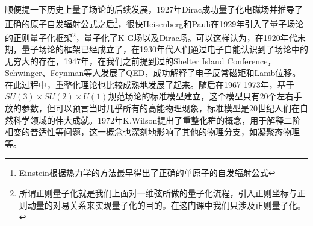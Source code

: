     顺便提一下历史上量子场论的后续发展，1927年Dirac成功量子化电磁场并推导了正确的原子自发辐射公式之后\footnote{Einstein根据热力学的方法最早得出了正确的单原子的自发辐射公式}，很快Heisenberg和Pauli在1929年引入了量子场论的正则量子化框架\footnote{所谓正则量子化就是我们上面对一维弦所做的量子化流程，引入正则坐标与正则动量的对易关系来实现量子化的目的。在这门课中我们只涉及正则量子化。}，量子化了K-G场以及Dirac场。可以这样认为，在1920年代末期，量子场论的框架已经成立了，在1930年代人们通过电子自能认识到了场论中的无穷大的存在，1947年，在我们之前提到过的Shelter Island Conference，Schwinger、Feynman等人发展了QED，成功解释了电子反常磁矩和Lamb位移。在此过程中，重整化理论也比较成熟地发展了起来。随后在1967-1973年，基于$SU(3)\times SU(2)\times U(1)$规范场论的标准模型建立，这个模型只有20个左右手放的参数，但可以预言当时几乎所有的高能物理现象，标准模型是20世纪人们在自然科学领域的伟大成就。1972年K.Wilson提出了重整化群的概念，用于解释二阶相变的普适性等问题，这一概念也深刻地影响了其他的物理分支，如凝聚态物理等。
